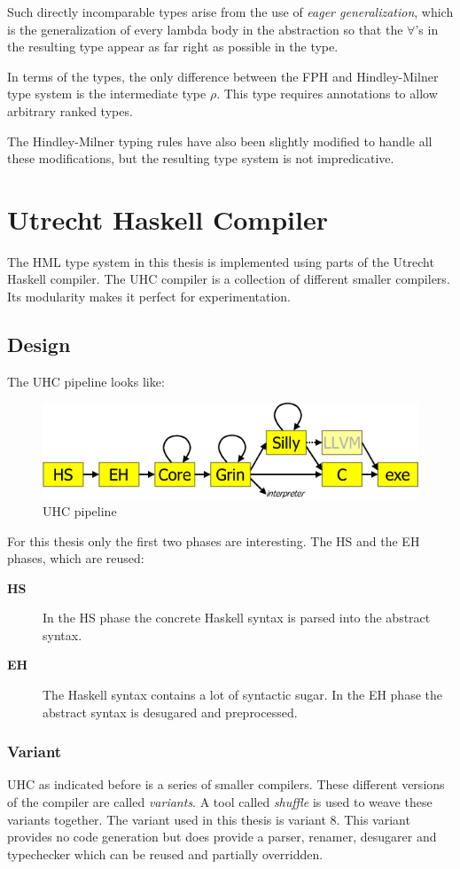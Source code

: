 \documentclass[twoside, titlepage, openright, a4paper]{book}
\begin{document}
Such directly incomparable types arise from the use of \textit{eager generalization}, which is the generalization of every lambda body in the abstraction so that the $\forall$'s in the resulting type appear as far right as possible in the type.

In terms of the types, the only difference between the FPH and Hindley-Milner type system is the intermediate type $\rho$. This type requires annotations to allow arbitrary ranked types.

The Hindley-Milner typing rules have also been slightly modified to handle all these modifications, but the resulting type system is not impredicative.

\chapter{Utrecht Haskell Compiler}
The HML type system in this thesis is implemented using parts of the Utrecht Haskell compiler. The UHC compiler is a collection of different smaller  compilers. Its modularity makes it perfect for experimentation.
\section{Design}
The UHC pipeline looks like:
\begin{figure}[H]
\includegraphics[scale=0.8]{ehc-dataflow2}
\caption{UHC pipeline}
\label{flow}
\end{figure}

For this thesis only the first two phases are interesting. The HS and the EH phases, which are reused:
\begin{description}
\item[\textbf{HS}] In the HS phase the concrete Haskell syntax is parsed into the abstract syntax. 
\item[\textbf{EH}] The Haskell syntax contains a lot of syntactic sugar. In the EH phase the abstract syntax is desugared and preprocessed.
\end{description}
\subsection{Variant}
UHC as indicated before is a series of smaller compilers. These different versions of the compiler are called \emph{variants}. A tool called \emph{shuffle} is used to weave these variants together. The variant used in this thesis is variant 8. This variant provides no code generation but does provide a parser, renamer, desugarer and typechecker which can be reused and partially overridden.
\end{document}
